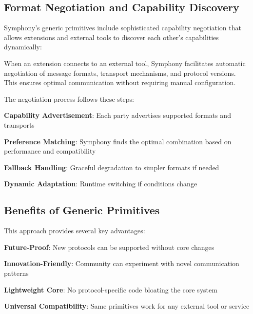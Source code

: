 \subsection*{Format Negotiation and Capability Discovery}

Symphony's generic primitives include sophisticated capability negotiation that allows extensions and external tools to discover each other's capabilities dynamically:

\begin{successbox}
When an extension connects to an external tool, Symphony facilitates automatic negotiation of message formats, transport mechanisms, and protocol versions. This ensures optimal communication without requiring manual configuration.
\end{successbox}

The negotiation process follows these steps:

\begin{expandedlist}
    \item \textbf{Capability Advertisement}: Each party advertises supported formats and transports
    \item \textbf{Preference Matching}: Symphony finds the optimal combination based on performance and compatibility
    \item \textbf{Fallback Handling}: Graceful degradation to simpler formats if needed
    \item \textbf{Dynamic Adaptation}: Runtime switching if conditions change
\end{expandedlist}

\subsection*{Benefits of Generic Primitives}

This approach provides several key advantages:

\begin{compactlist}
    \item \textbf{Future-Proof}: New protocols can be supported without core changes
    \item \textbf{Innovation-Friendly}: Community can experiment with novel communication patterns
    \item \textbf{Lightweight Core}: No protocol-specific code bloating the core system
    \item \textbf{Universal Compatibility}: Same primitives work for any external tool or service
\end{compactlist}

